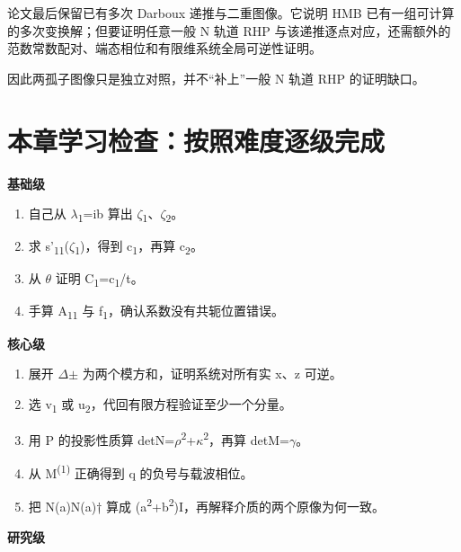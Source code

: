 论文最后保留已有多次 Darboux 递推与二重图像。它说明 HMB 已有一组可计算的多次变换解；但要证明任意一般 N 轨道 RHP 与该递推逐点对应，还需额外的范数常数配对、端态相位和有限维系统全局可逆性证明。\par

因此两孤子图像只是独立对照，并不“补上”一般 N 轨道 RHP 的证明缺口。\par

\section{本章学习检查：按照难度逐级完成}

\textbf{基础级}\par

\begin{enumerate}[leftmargin=2em]
\item 自己从 \ensuremath{\lambda}\textsubscript{1}=ib 算出 \ensuremath{\zeta}\textsubscript{1}、\ensuremath{\zeta}\textsubscript{2}。
\item 求 s'\textsubscript{1}\textsubscript{1}(\ensuremath{\zeta}\textsubscript{1})，得到 c\textsubscript{1}，再算 c\textsubscript{2}。
\item 从 \ensuremath{\theta} 证明 C\textsubscript{1}=c\textsubscript{1}/t。
\item 手算 A\textsubscript{1}\textsubscript{1} 与 f\textsubscript{1}，确认系数没有共轭位置错误。
\end{enumerate}

\textbf{核心级}\par

\begin{enumerate}[leftmargin=2em]
\item 展开 \ensuremath{\Delta}\ensuremath{\pm} 为两个模方和，证明系统对所有实 x、z 可逆。
\item 选 v\textsubscript{1} 或 u\textsubscript{2}，代回有限方程验证至少一个分量。
\item 用 P 的投影性质算 detN=\ensuremath{\rho}\textsuperscript{2}+\ensuremath{\kappa}\textsuperscript{2}，再算 detM=\ensuremath{\gamma}。
\item 从 M\textsuperscript{(}\textsuperscript{1}\textsuperscript{)} 正确得到 q 的负号与载波相位。
\item 把 N(a)N(a)† 算成 (a\textsuperscript{2}+b\textsuperscript{2})I，再解释介质的两个原像为何一致。
\end{enumerate}

\textbf{研究级}\par

